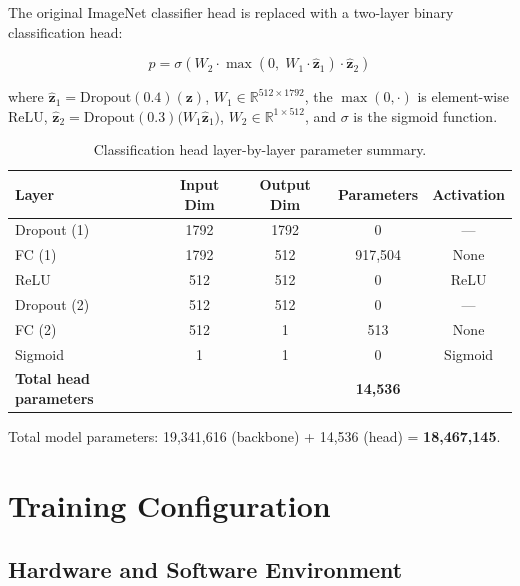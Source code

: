 \documentclass[12pt,a4paper,oneside]{report}
\begin{document}
The original ImageNet classifier head is replaced with a two-layer binary
classification head:

\begin{equation}
p = \sigma\!\left(
  W_2 \cdot \max\!\left(0,\; W_1 \cdot \hat{\mathbf{z}}_1\right) \cdot \hat{\mathbf{z}}_2
\right)
\label{eq:head}
\end{equation}

where $\hat{\mathbf{z}}_1 = \text{Dropout}(0.4)(\mathbf{z})$,
$W_1 \in \mathbb{R}^{512 \times 1792}$, the $\max(0, \cdot)$ is element-wise
ReLU, $\hat{\mathbf{z}}_2 = \text{Dropout}(0.3)\bigl(W_1\hat{\mathbf{z}}_1\bigr)$,
$W_2 \in \mathbb{R}^{1 \times 512}$, and $\sigma$ is the sigmoid function.

\begin{table}[H]
\centering
\caption{Classification head layer-by-layer parameter summary.}
\label{tab:head_params}
\renewcommand{\arraystretch}{1.3}
\begin{tabular}{lcccc}
\toprule
\textbf{Layer} & \textbf{Input Dim} & \textbf{Output Dim} & \textbf{Parameters} & \textbf{Activation} \\
\midrule
Dropout (1)    & 1792 & 1792 & 0       & --- \\
FC (1)         & 1792 & 512  & 917,504 & None \\
ReLU           & 512  & 512  & 0       & ReLU \\
Dropout (2)    & 512  & 512  & 0       & --- \\
FC (2)         & 512  & 1    & 513     & None \\
Sigmoid        & 1    & 1    & 0       & Sigmoid \\
\midrule
\textbf{Total head parameters} & & & \textbf{14,536} & \\
\bottomrule
\end{tabular}
\end{table}

Total model parameters: 19,341,616 (backbone) + 14,536 (head) = \textbf{18,467,145}.

\section{Training Configuration}
\label{sec:training}

\subsection{Hardware and Software Environment}
\end{document}
